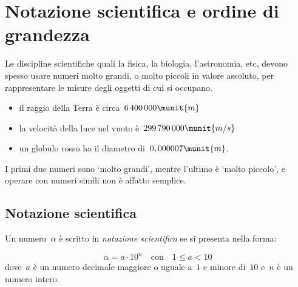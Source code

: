 \section{Notazione scientifica e ordine di grandezza}
\label{sec:razionali_notazione_scientifica}

Le discipline scientifiche quali la fisica, la biologia, l'astronomia, etc,
devono spesso usare numeri molto grandi, o molto piccoli in valore assoluto, 
per rappresentare le misure degli oggetti di cui si occupano.


\begin{itemize} [nosep]
\item il raggio della Terra è circa~\(6\,400\,000\munit{m}\)
\item la velocità della luce nel vuoto è~\(299\,790\,000\munit{m/s}\)
\item un globulo rosso ha il diametro di~\(0,000007\munit{m}\).
\end{itemize}

I primi due numeri sono `molto grandi', mentre l'ultimo è `molto piccolo', e 
operare con numeri simili non è affatto semplice.

\subsection{Notazione scientifica}
\begin{definizione}{}{}
Un numero~\(\alpha\) è scritto in \emph{notazione scientifica} se
si presenta nella forma:

\vspace{-1em}
\[\alpha = a\cdot 10^n \quad \text{con} \quad 1 \leqslant a < 10\] 
dove~\(a\) è un numero decimale maggiore o uguale a~\(1\) e minore di~\(10\) 
e~\(n\) è un numero intero.
\end{definizione}

% 

